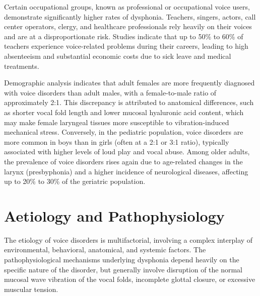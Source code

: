 Certain occupational groups, known as professional or occupational voice users, demonstrate significantly higher rates of dysphonia. Teachers, singers, actors, call center operators, clergy, and healthcare professionals rely heavily on their voices and are at a disproportionate risk. Studies indicate that up to 50\% to 60\% of teachers experience voice-related problems during their careers, leading to high absenteeism and substantial economic costs due to sick leave and medical treatments.

Demographic analysis indicates that adult females are more frequently diagnosed with voice disorders than adult males, with a female-to-male ratio of approximately 2:1. This discrepancy is attributed to anatomical differences, such as shorter vocal fold length and lower mucosal hyaluronic acid content, which may make female laryngeal tissues more susceptible to vibration-induced mechanical stress. Conversely, in the pediatric population, voice disorders are more common in boys than in girls (often at a 2:1 or 3:1 ratio), typically associated with higher levels of loud play and vocal abuse. Among older adults, the prevalence of voice disorders rises again due to age-related changes in the larynx (presbyphonia) and a higher incidence of neurological diseases, affecting up to 20\% to 30\% of the geriatric population.

\section*{Aetiology and Pathophysiology}
The etiology of voice disorders is multifactorial, involving a complex interplay of environmental, behavioral, anatomical, and systemic factors. The pathophysiological mechanisms underlying dysphonia depend heavily on the specific nature of the disorder, but generally involve disruption of the normal mucosal wave vibration of the vocal folds, incomplete glottal closure, or excessive muscular tension.

